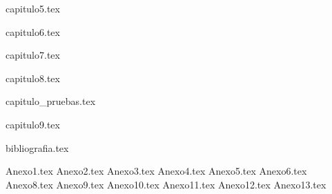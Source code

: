 \documentclass[11pt,tesis,twoside,openright,spanish]{upiiztt}
\begin{document}
{capitulo5.tex}

{capitulo6.tex}

{capitulo7.tex}

{capitulo8.tex}

{capitulo_pruebas.tex}

{capitulo9.tex}

{bibliografia.tex}

\appendix
{Anexo1.tex}
{Anexo2.tex}
{Anexo3.tex}
{Anexo4.tex}
{Anexo5.tex}
{Anexo6.tex}
{Anexo8.tex}
{Anexo9.tex}
{Anexo10.tex}
{Anexo11.tex}
{Anexo12.tex}
{Anexo13.tex}

\end{document}
